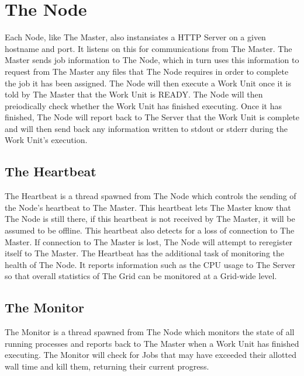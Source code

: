 \section{The Node}
Each Node, like The Master, also instansiates a HTTP Server on a given hostname and port. It listens on this for communications from The Master. The Master sends job information to The Node, which in turn uses this information to request from The Master any files that The Node requires in order to complete the job it has been assigned. The Node will then execute a Work Unit once it is told by The Master that the Work Unit is READY. The Node will then preiodically check whether the Work Unit has finished executing. Once it has finished, The Node will report back to The Server that the Work Unit is complete and will then send back any information written to stdout or stderr during the Work Unit's execution.

\subsection{The Heartbeat}
The Heartbeat is a thread spawned from The Node which controls the sending of the Node's heartbeat to The Master. This heartbeat lets The Master know that The Node is still there, if this heartbeat is not received by The Master, it will be assumed to be offline. This heartbeat also detects for a loss of connection to The Master. If connection to The Master is lost, The Node will attempt to reregister itself to The Master. The Heartbeat has the additional task of monitoring the health of The Node. It reports information such as the CPU usage to The Server so that overall statistics of The Grid can be monitored at a Grid-wide level.

\subsection{The Monitor}
The Monitor is a thread spawned from The Node which monitors the state of all running processes and reports back to The Master when a Work Unit has finished executing. The Monitor will check for Jobs that may have exceeded their allotted wall time and kill them, returning their current progress.

